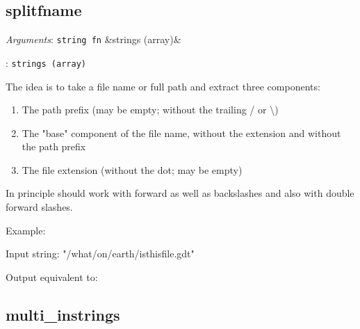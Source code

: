 \documentclass[11pt,english]{article}
\newcommand{\ArgRet}[2]{%
  {\it Arguments}: {#1}%
  \ifx&#2&%
  \else
  \par\smallskip\noindent {\it Return type}: \texttt{#2}
  \fi%
  \par\medskip\par%
  }
\begin{document}



\subsection{splitfname}

\ArgRet{\texttt{string fn}}{strings (array)}

The idea is to take a file name or full path and extract three components:
\begin{enumerate}
\item The path prefix (may be empty; without the trailing / or \textbackslash)
\item The "base" component of the file name, without the extension and without the path prefix
\item The file extension (without the dot; may be empty)
\end{enumerate}
In principle should work with forward as well as backslashes and also with double forward slashes.

Example:

Input string: "/what/on/earth/isthisfile.gdt"

Output equivalent to:


\subsection{multi\_instrings}
\end{document}
